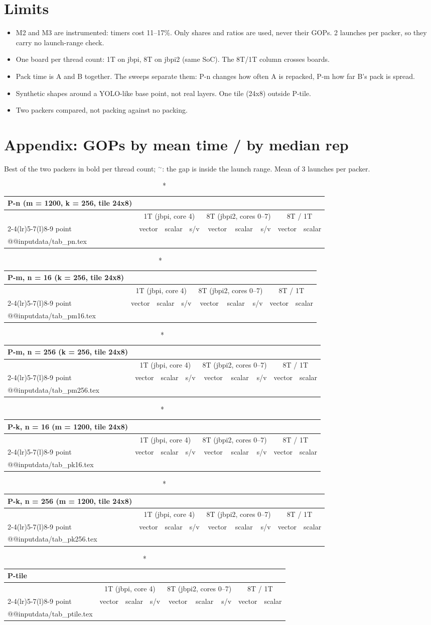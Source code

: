 \documentclass[10pt,a4paper]{article}
\makeatletter
\newcommand{\gopstable}[2]{%
\begin{longtable}{@{}l rrr rrr rr@{}}
\caption*{\small\bfseries #2}\\
\toprule
 & \multicolumn{3}{c}{1T (jbpi, core 4)} & \multicolumn{3}{c}{8T (jbpi2, cores 0--7)} & \multicolumn{2}{c}{8T / 1T} \\
\cmidrule(lr){2-4}\cmidrule(lr){5-7}\cmidrule(l){8-9}
point & vector & scalar & s/v & vector & scalar & s/v & vector & scalar \\
\midrule\endhead
\csname @@input\endcsname #1
\bottomrule
\end{longtable}}
\makeatother
\begin{document}
\section*{Limits}
\begin{itemize}\setlength\itemsep{1pt}
\item M2 and M3 are instrumented: timers cost 11--17\%. Only shares and ratios are used, never their GOPs. 2 launches per packer, so they carry no launch-range check.
\item One board per thread count: 1T on jbpi, 8T on jbpi2 (same SoC). The 8T/1T column crosses boards.
\item Pack time is A and B together. The sweeps separate them: P-n changes how often A is repacked, P-m how far B's pack is spread.
\item Synthetic shapes around a YOLO-like base point, not real layers. One tile (24x8) outside P-tile.
\item Two packers compared, not packing against no packing.
\end{itemize}

\clearpage
\section*{Appendix: GOPs by mean time / by median rep}
Best of the two packers in bold per thread count; $^{\sim}$: the gap is inside the launch range. Mean of 3 launches per packer.
{\footnotesize\setlength\tabcolsep{4pt}
\gopstable{data/tab_pn.tex}{P-n (m = 1200, k = 256, tile 24x8)}
\gopstable{data/tab_pm16.tex}{P-m, n = 16 (k = 256, tile 24x8)}
\gopstable{data/tab_pm256.tex}{P-m, n = 256 (k = 256, tile 24x8)}
\gopstable{data/tab_pk16.tex}{P-k, n = 16 (m = 1200, tile 24x8)}
\gopstable{data/tab_pk256.tex}{P-k, n = 256 (m = 1200, tile 24x8)}
\gopstable{data/tab_ptile.tex}{P-tile}
}
\end{document}
